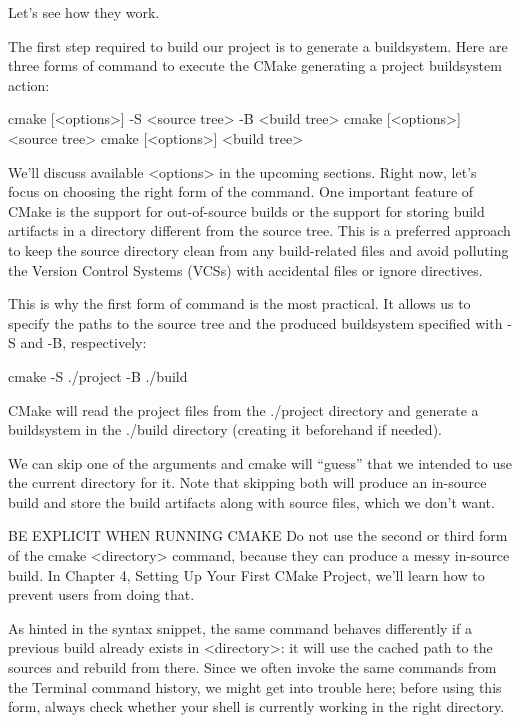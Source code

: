 Let’s see how they work.


The first step required to build our project is to generate a buildsystem. Here are three forms of command to execute the CMake generating a project buildsystem action:

\begin{shell}
cmake [<options>] -S <source tree> -B <build tree>
cmake [<options>] <source tree>
cmake [<options>] <build tree>
\end{shell}

We’ll discuss available <options> in the upcoming sections. Right now, let’s focus on choosing the right form of the command. One important feature of CMake is the support for out-of-source builds or the support for storing build artifacts in a directory different from the source tree. This is a preferred approach to keep the source directory clean from any build-related files and avoid polluting the Version Control Systems (VCSs) with accidental files or ignore directives.

This is why the first form of command is the most practical. It allows us to specify the paths to the source tree and the produced buildsystem specified with -S and -B, respectively:

\begin{shell}
cmake -S ./project -B ./build
\end{shell}

CMake will read the project files from the ./project directory and generate a buildsystem in the ./build directory (creating it beforehand if needed).

We can skip one of the arguments and cmake will “guess” that we intended to use the current directory for it. Note that skipping both will produce an in-source build and store the build artifacts along with source files, which we don’t want.

\begin{myNotic}{BE EXPLICIT WHEN RUNNING CMAKE}
Do not use the second or third form of the cmake <directory> command, because they can produce a messy in-source build. In Chapter 4, Setting Up Your First CMake Project, we’ll learn how to prevent users from doing that.

As hinted in the syntax snippet, the same command behaves differently if a previous build already exists in <directory>: it will use the cached path to the sources and rebuild from there. Since we often invoke the same commands from the Terminal command history, we might get into trouble here; before using this form, always check whether your shell is currently working in the right directory.
\end{myNotic}


